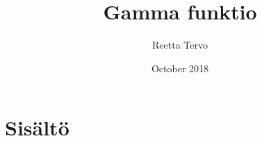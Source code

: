 \documentclass{article}
\title{Gamma funktio}
\author{Reetta Tervo }
\date{October 2018}
\begin{document}
\maketitle

\newpage

\section{Sisältö}
\end{document}
